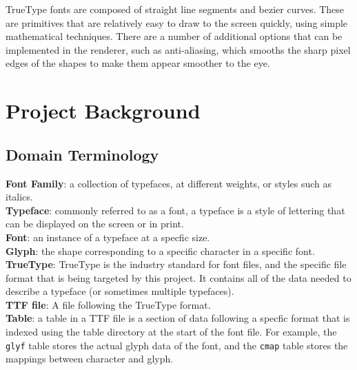 \documentclass{report}
\begin{document}
TrueType fonts are composed of straight line segments and bezier curves. These
are primitives that are relatively easy to draw to the screen quickly, using
simple mathematical techniques. There are a number of additional options that
can be implemented in the renderer, such as anti-aliasing, which smooths the
sharp pixel edges of the shapes to make them appear smoother to the eye.



\newpage
\section{Project Background}

\subsection{Domain Terminology}
\textbf{Font Family}: a collection of typefaces, at different weights, or styles
such as italics.
\\
\textbf{Typeface}: commonly referred to as a font, a typeface is a style of
lettering that can be displayed on the screen or in print.
\\
\textbf{Font}: an instance of a typeface at a specfic size.
\\
\textbf{Glyph}: the shape corresponding to a specific character in a specific
font.
\\
\textbf{TrueType}: TrueType is the industry standard for font files, and the
specific file format that is being targeted by this project. It contains all of
the data needed to describe a typeface (or sometimes multiple typefaces).
\\
\textbf{TTF file}: A file following the TrueType format.
\\
\textbf{Table}: a table in a TTF file is a section of data following a specfic
format that is indexed using the table directory at the start of the font file.
For example, the \texttt{glyf} table stores the actual glyph data of the font,
and the \texttt{cmap} table stores the mappings between character and glyph.
\end{document}
